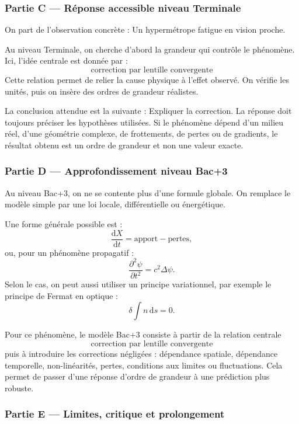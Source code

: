 \documentclass[11pt,a4paper]{article}
\begin{document}
\subsubsection*{Partie C — Réponse accessible niveau Terminale}

\begin{corrigebox}
On part de l'observation concrète : Un hypermétrope fatigue en vision proche.

Au niveau Terminale, on cherche d'abord la grandeur qui contrôle le phénomène. Ici, l'idée centrale est donnée par :
\[
\text{correction par lentille convergente}
\]
Cette relation permet de relier la cause physique à l'effet observé. On vérifie les unités, puis on insère des ordres de grandeur réalistes.

La conclusion attendue est la suivante : Expliquer la correction. La réponse doit toujours préciser les hypothèses utilisées. Si le phénomène dépend d'un milieu réel, d'une géométrie complexe, de frottements, de pertes ou de gradients, le résultat obtenu est un ordre de grandeur et non une valeur exacte.
\end{corrigebox}

\subsubsection*{Partie D — Approfondissement niveau Bac+3}

\begin{approfondissementbox}
Au niveau Bac+3, on ne se contente plus d'une formule globale. On remplace le modèle simple par une loi locale, différentielle ou énergétique.

Une forme générale possible est :
\[
\frac{\mathrm d X}{\mathrm dt}=\text{apport}-\text{pertes},
\]
ou, pour un phénomène propagatif :
\[
\frac{\partial^2 \psi}{\partial t^2}=c^2\Delta\psi.
\]
Selon le cas, on peut aussi utiliser un principe variationnel, par exemple le principe de Fermat en optique :
\[
\delta \int n\,\mathrm ds=0.
\]

Pour ce phénomène, le modèle Bac+3 consiste à partir de la relation centrale
\[
\text{correction par lentille convergente}
\]
puis à introduire les corrections négligées : dépendance spatiale, dépendance temporelle, non-linéarités, pertes, conditions aux limites ou fluctuations. Cela permet de passer d'une réponse d'ordre de grandeur à une prédiction plus robuste.
\end{approfondissementbox}

\subsubsection*{Partie E — Limites, critique et prolongement}
\end{document}

